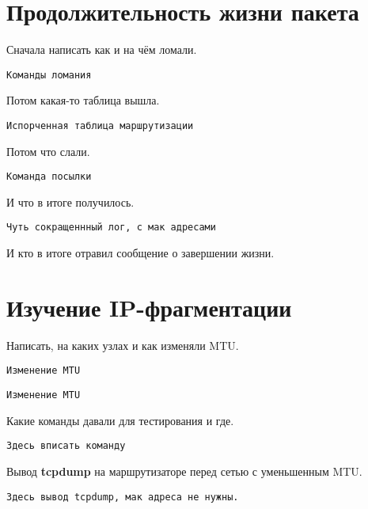 \documentclass[a4paper,12pt]{article}
\begin{document}
\section{Продолжительность жизни пакета}

Сначала написать как и на чём ломали. 

\begin{Verbatim}
Команды ломания
\end{Verbatim}

Потом какая-то таблица вышла.

\begin{Verbatim}
Испорченная таблица маршрутизации
\end{Verbatim}

Потом что слали.

\begin{Verbatim}
Команда посылки
\end{Verbatim}

И что в итоге получилось.

\begin{Verbatim}
Чуть сокращеннный лог, с мак адресами
\end{Verbatim}

И кто в итоге отравил сообщение о завершении жизни.

\section{Изучение IP-фрагментации}

Написать, на каких узлах и как изменяли MTU.


\begin{Verbatim}
Изменение MTU
\end{Verbatim}

\begin{Verbatim}
Изменение MTU
\end{Verbatim}


Какие команды давали для тестирования и где.

\begin{Verbatim}
Здесь вписать команду
\end{Verbatim}

Вывод \textbf{tcpdump} на маршрутизаторе перед сетью с уменьшенным MTU.


\begin{Verbatim}
Здесь вывод tcpdump, мак адреса не нужны.
\end{Verbatim}
\end{document}
